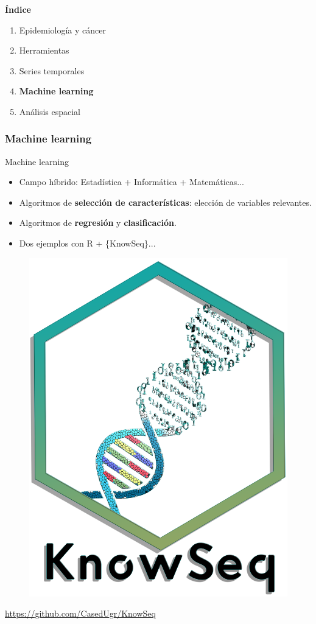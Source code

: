 \documentclass{beamer}
\begin{document}

\begin{frame}\frametitle{}
	\Large{\textbf{Índice}}\\[2ex]
	\normalsize
	\begin{enumerate}
		\item Epidemiología y cáncer\\[2ex]
		\item Herramientas\\[2ex]
		\item Series temporales \\[2ex]
		\item \textbf{Machine learning}  \\[2ex]
		\item Análisis espacial \\[2ex]
	\end{enumerate}
\end{frame}


\begin{frame}\frametitle{Machine learning}
	\begin{block}{Machine learning}
		\begin{itemize}
			\item Campo híbrido: Estadística + Informática + Matemáticas... \\[2ex]
			\item Algoritmos de \textbf{selección de características}: elección de variables relevantes.\\[2ex]
			\item Algoritmos de \textbf{regresión} y \textbf{clasificación}.\\[2ex]
			\item Dos ejemplos con R + \{KnowSeq\}...
		\end{itemize}
		\begin{figure}
			\centering
			\includegraphics[width=.15\textwidth]{images/06_logo_knowseq.png}			
		\end{figure}
		\vspace{-10pt}
		\centering
		\url{https://github.com/CasedUgr/KnowSeq}
	\end{block}
\end{frame}
\end{document}
